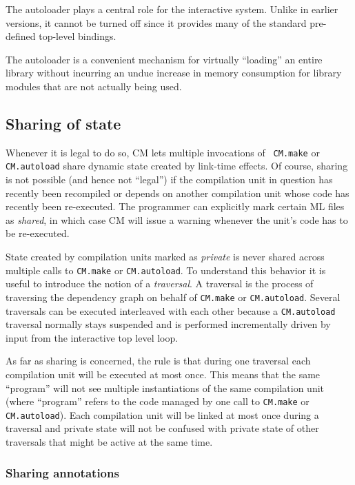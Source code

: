 \documentclass[titlepage,letterpaper]{article}
\begin{document}
The autoloader plays a central role for the interactive system.
Unlike in earlier versions, it cannot be turned off since it provides
many of the standard pre-defined top-level bindings.

The autoloader is a convenient mechanism for virtually ``loading'' an
entire library without incurring an undue increase in memory
consumption for library modules that are not actually being used.

\subsection{Sharing of state}
\label{sec:sharing}

Whenever it is legal to do so, CM lets multiple invocations of {\tt
CM.make} or {\tt CM.autoload} share dynamic state created by link-time
effects.  Of course, sharing is not possible (and hence not ``legal'')
if the compilation unit in question has recently been recompiled or
depends on another compilation unit whose code has recently been
re-executed.  The programmer can explicitly mark certain ML files as
{\em shared}, in which case CM will issue a warning whenever the
unit's code has to be re-executed.

State created by compilation units marked as {\em private} is never
shared across multiple calls to {\tt CM.make} or {\tt CM.autoload}.
To understand this behavior it is useful to introduce the notion of a
{\em traversal}.  A traversal is the process of traversing the
dependency graph on behalf of {\tt CM.make} or {\tt CM.autoload}.
Several traversals can be executed interleaved with each other because
a {\tt CM.autoload} traversal normally stays suspended and is
performed incrementally driven by input from the interactive top level
loop.

As far as sharing is concerned, the rule is that during one traversal
each compilation unit will be executed at most once.  This means that
the same ``program'' will not see multiple instantiations of the same
compilation unit (where ``program'' refers to the code managed by one
call to {\tt CM.make} or {\tt CM.autoload}).  Each compilation unit
will be linked at most once during a traversal and private state
will not be confused with private state of other traversals that might
be active at the same time.


\subsubsection*{Sharing annotations}
\end{document}
